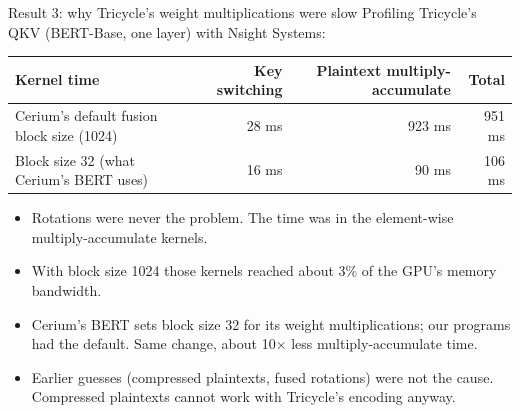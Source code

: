 \documentclass[aspectratio=169]{beamer}
\begin{document}
\begin{frame}{Result 3: why Tricycle's weight multiplications were slow}
\small
Profiling Tricycle's QKV (BERT-Base, one layer) with Nsight Systems:
\begin{center}\footnotesize
\begin{tabular}{@{}lrrr@{}}
\toprule
\textbf{Kernel time} & \textbf{Key switching} & \textbf{Plaintext multiply-accumulate} & \textbf{Total}\\
\midrule
Cerium's default fusion block size (1024) & 28 ms & 923 ms & 951 ms\\
Block size 32 (what Cerium's BERT uses) & 16 ms & 90 ms & 106 ms\\
\bottomrule
\end{tabular}
\end{center}
\begin{itemize}\small
  \item Rotations were never the problem. The time was in the element-wise multiply-accumulate kernels.
  \item With block size 1024 those kernels reached about 3\% of the GPU's memory bandwidth.
  \item Cerium's BERT sets block size 32 for its weight multiplications; our programs had the default. Same change, about 10$\times$ less multiply-accumulate time.
  \item Earlier guesses (compressed plaintexts, fused rotations) were not the cause. Compressed plaintexts cannot work with Tricycle's encoding anyway.
\end{itemize}
\end{frame}
\end{document}
